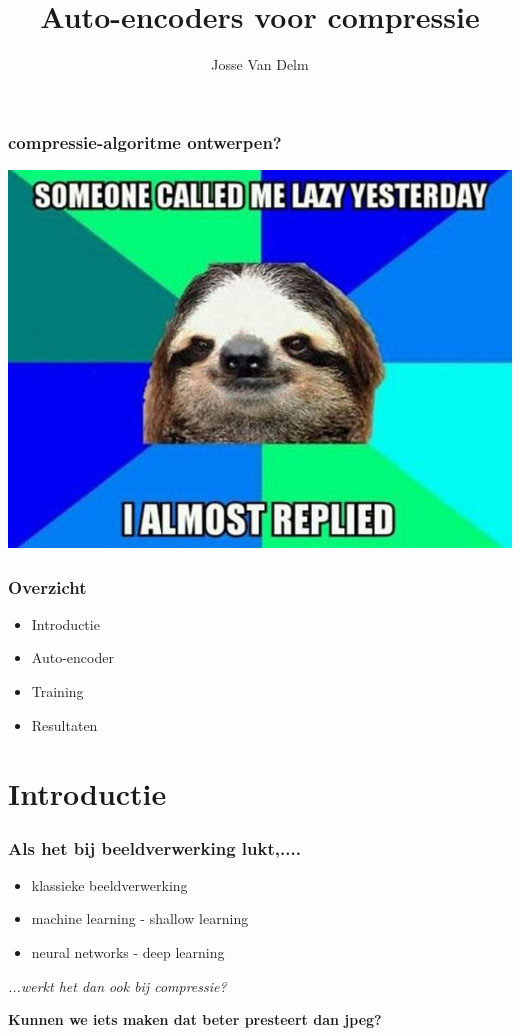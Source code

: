 \documentclass[]{beamer}
\title{Auto-encoders voor compressie}
\author{Josse Van Delm}
\begin{document}
\begin{frame}
	\frametitle{compressie-algoritme ontwerpen?}
	\pause
	\includegraphics[height =0.85 \textheight]{lazy.jpg}
\end{frame}

\begin{frame}
	\maketitle
\end{frame}

\begin{frame}
	\frametitle{Overzicht}
	\begin{itemize} \pause
		\item Introductie \pause
		\item Auto-encoder \pause
		\item Training \pause
		\item Resultaten 
	\end{itemize}
\end{frame}

\section{Introductie}
\begin{frame}
	\frametitle{Als het bij beeldverwerking lukt,....}
	\begin{itemize} \pause
		\item klassieke beeldverwerking \pause
		\item machine learning - shallow learning \pause
		\item neural networks - deep learning  \pause
	\end{itemize}
	\emph{...werkt het dan ook bij compressie?} \pause

	\begin{center}
		\textbf{\large{Kunnen we iets maken dat beter presteert dan jpeg?}}
	\end{center}
\end{frame}
\end{document}
